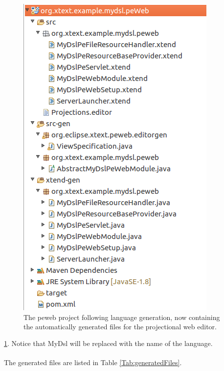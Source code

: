 \documentclass{article}
\begin{document}
\begin{figure}[h!]
  \centering
  \includegraphics[width=0.33\linewidth]{./Screenshots/peWebProjectContentsAfterGeneration.png}
  \caption{The peweb project following language generation, now containing the automatically generated files for the projectional web editor.}
  \label{fig:generatedPeWebProject}
\end{figure} \ref{fig:generatedPeWebProject}. Notice that MyDsl will be replaced with the name of the language.
\\
\\
The generated files are listed in Table \ref{Tab:generatedFiles}.
\end{document}
